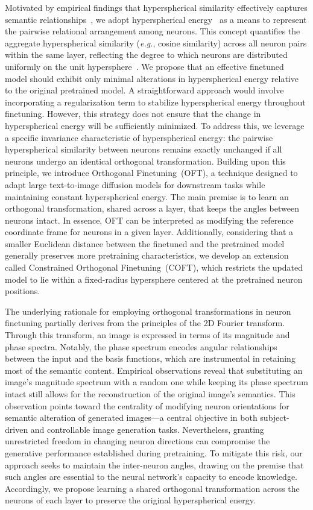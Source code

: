 Motivated by empirical findings that hyperspherical similarity effectively captures semantic relationships~\cite{liu2017deep,liu2018decoupled,chen2020angular}, we adopt hyperspherical energy~\cite{liu2018learning} as a means to represent the pairwise relational arrangement among neurons. This concept quantifies the aggregate hyperspherical similarity (\emph{e.g.}, cosine similarity) across all neuron pairs within the same layer, reflecting the degree to which neurons are distributed uniformly on the unit hypersphere~\cite{liu2021learning}. We propose that an effective finetuned model should exhibit only minimal alterations in hyperspherical energy relative to the original pretrained model. A straightforward approach would involve incorporating a regularization term to stabilize hyperspherical energy throughout finetuning. However, this strategy does not ensure that the change in hyperspherical energy will be sufficiently minimized. To address this, we leverage a specific invariance characteristic of hyperspherical energy: the pairwise hyperspherical similarity between neurons remains exactly unchanged if all neurons undergo an identical orthogonal transformation. Building upon this principle, we introduce Orthogonal Finetuning~(OFT), a technique designed to adapt large text-to-image diffusion models for downstream tasks while maintaining constant hyperspherical energy. The main premise is to learn an orthogonal transformation, shared across a layer, that keeps the angles between neurons intact. In essence, OFT can be interpreted as modifying the reference coordinate frame for neurons in a given layer. Additionally, considering that a smaller Euclidean distance between the finetuned and the pretrained model generally preserves more pretraining characteristics, we develop an extension called Constrained Orthogonal Finetuning~(COFT), which restricts the updated model to lie within a fixed-radius hypersphere centered at the pretrained neuron positions.

The underlying rationale for employing orthogonal transformations in neuron finetuning partially derives from the principles of the 2D Fourier transform. Through this transform, an image is expressed in terms of its magnitude and phase spectra. Notably, the phase spectrum encodes angular relationships between the input and the basis functions, which are instrumental in retaining most of the semantic content. Empirical observations reveal that substituting an image’s magnitude spectrum with a random one while keeping its phase spectrum intact still allows for the reconstruction of the original image’s semantics. This observation points toward the centrality of modifying neuron orientations for semantic alteration of generated images—a central objective in both subject-driven and controllable image generation tasks. Nevertheless, granting unrestricted freedom in changing neuron directions can compromise the generative performance established during pretraining. To mitigate this risk, our approach seeks to maintain the inter-neuron angles, drawing on the premise that such angles are essential to the neural network's capacity to encode knowledge. Accordingly, we propose learning a shared orthogonal transformation across the neurons of each layer to preserve the original hyperspherical energy.

